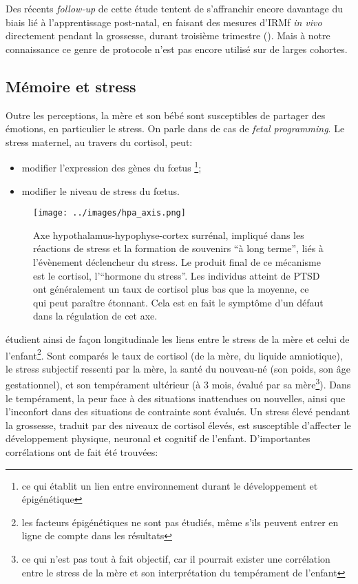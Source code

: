 \documentclass[french]{article}
\begin{document}
				Des récents \textit{follow-up} de cette étude tentent de s'affranchir encore davantage du biais lié à l'apprentissage post-natal, en faisant des mesures d'IRMf \textit{in vivo} directement pendant la grossesse, durant troisième trimestre (\cite{jardri2012}). Mais à notre connaissance ce genre de protocole n'est pas encore utilisé sur de larges cohortes.
				
			\subsection{Mémoire et stress}\label{stress}
				Outre les perceptions, la mère et son bébé sont susceptibles de partager des émotions, en particulier le stress. On parle dans de cas de \textit{fetal programming}. Le stress maternel, au travers du cortisol, peut:
				\begin{itemize}
					\item modifier l'expression des gènes du fœtus \footnote{ce qui établit un lien entre environnement durant le développement et épigénétique};
					\item modifier le niveau de stress du fœtus.
				\end{itemize} \vspace{3mm}
				\begin{figure}[H]
					\centering
					\texttt{[image: ../images/hpa\_axis.png]}
					\caption{Axe hypothalamus-hypophyse-cortex surrénal, impliqué dans les réactions de stress et la formation de souvenirs ``à long terme'', liés à l'évènement déclencheur du stress. Le produit final de ce mécanisme est le cortisol, l'``hormone du stress''. Les individus atteint de PTSD ont généralement un taux de cortisol plus bas que la moyenne, ce qui  peut paraître étonnant. Cela est en fait le symptôme d'un défaut dans la régulation de cet axe.}
					\label{fig:hpa}
				\end{figure}
				\cite{baibazarova2013} étudient ainsi de façon longitudinale les liens entre le stress de la mère et celui de l'enfant\footnote{les facteurs épigénétiques ne sont pas étudiés, même s'ils peuvent entrer en ligne de compte dans les résultats}. Sont comparés le taux de cortisol (de la mère, du liquide amniotique), le stress subjectif ressenti par la mère, la santé du nouveau-né (son poids, son âge gestationnel), et son tempérament ultérieur (à 3 mois, évalué par sa mère\footnote{ce qui n'est pas tout à fait objectif, car il pourrait exister une corrélation entre le stress de la mère et son interprétation du tempérament de l'enfant}). Dans le tempérament, la peur face à des situations inattendues ou nouvelles, ainsi que l'inconfort dans des situations de contrainte sont évalués. Un stress élevé pendant la grossesse, traduit par des niveaux de cortisol élevés, est susceptible d'affecter le développement physique, neuronal et cognitif de l'enfant. D'importantes corrélations ont de fait été trouvées:
\end{document}
